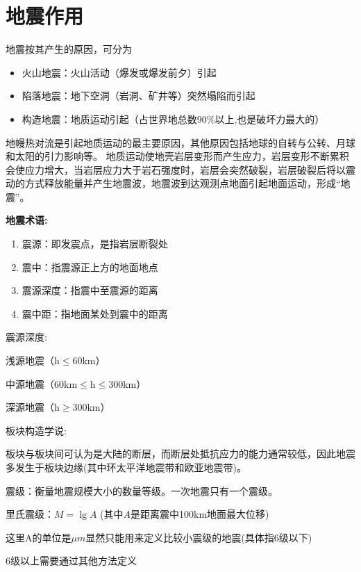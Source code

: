 \documentclass[12pt, a4paper, oneside, UTF8]{ctexbook}
\begin{document}
% 
\else
\fi

\chapter{地震作用}
地震按其产生的原因，可分为

\begin{itemize}
    \item  火山地震：火山活动（爆发或爆发前夕）引起
    \item 陷落地震：地下空洞（岩洞、矿井等）突然塌陷而引起
    \item 构造地震：地质运动引起（占世界地总数90\%以上,{\color{red}也是破坏力最大的}）
\end{itemize}

地幔热对流是引起地质运动的最主要原因，其他原因包括地球的自转与公转、月球和太阳的引力影响等。
地质运动使地壳岩层变形而产生应力，岩层变形不断累积会使应力增大，当岩层应力大于岩石强度时，岩层会突然破裂，岩层破裂后将以震动的方式释放能量并产生地震波，地震波到达观测点地面引起地面运动，形成“地震”。

\textbf{地震术语:}

\begin{enumerate}
    \item 震源：即发震点，是指岩层断裂处
    \item 震中：指震源正上方的地面地点
    \item 震源深度：指震中至震源的距离
    \item 震中距：指地面某处到震中的距离
\end{enumerate}

\begin{remark}
震源深度:

浅源地震（h$\leq$60km）

中源地震（60km$\leq$h$\leq$300km）

深源地震（h$\geq$300km）
\end{remark}

板块构造学说:

板块与板块间可认为是大陆的断层，而断层处抵抗应力的能力通常较低，因此地震多发生于板块边缘({\color{red}其中环太平洋地震带和欧亚地震带})。

\begin{theorem}
    震级：衡量地震规模大小的数量等级。一次地震只有一个震级。

里氏震级：$M = \lg A$ \quad (其中$A$是距离震中100km地面最大位移)
\end{theorem}

\begin{remark}
    这里A的单位是$\mu m$显然只能用来定义比较小震级的地震(具体指6级以下)

    6级以上需要通过其他方法定义
\end{remark}
\end{document}
